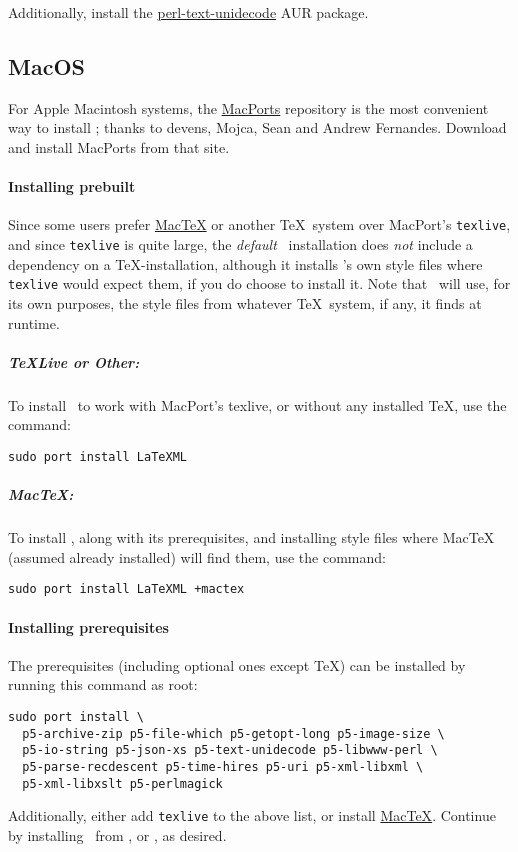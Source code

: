 \documentclass{article}
\begin{document}
Additionally, install the \href{https://aur.archlinux.org/packages/perl-text-unidecode/}{perl-text-unidecode}
AUR package. 



\subsection{MacOS}\label{install.mac}
For Apple Macintosh systems, the  \href{http://www.macports.org}{MacPorts}
repository is the most convenient way to install \LaTeXML;
thanks to devens, Mojca, Sean and Andrew Fernandes.
Download and install MacPorts from that site.

\paragraph{Installing prebuilt}
Since some users prefer \href{http://tug.org/mactex/}{MacTeX} or another
\TeX\ system over MacPort's \texttt{texlive}, and since \texttt{texlive} is quite large,
the \emph{default} \LaTeXML\ installation does \emph{not} include a dependency
on a \TeX-installation, although it installs \LaTeXML's own style files where \texttt{texlive}
would expect them, if you do choose to install it.
Note that \LaTeXML\ will use, for its own purposes, the style files from whatever
\TeX\ system, if any, it finds at runtime.

\subparagraph{TeXLive or Other:} To install \LaTeXML\ to work with MacPort's texlive,
or without any installed \TeX, use the command:
\begin{lstlisting}[style=shell]
sudo port install LaTeXML
\end{lstlisting}

\subparagraph{MacTeX:}  To install \LaTeXML, along with its prerequisites,
and installing style files where MacTeX (assumed already installed) will find them,
use the command:
\begin{lstlisting}[style=shell]
sudo port install LaTeXML +mactex
\end{lstlisting}

\paragraph{Installing prerequisites}\label{install.mac.prereq}
The prerequisites (including optional ones except \TeX) can be installed by running
this command as root: 
\begin{lstlisting}[style=shell]
sudo port install \
  p5-archive-zip p5-file-which p5-getopt-long p5-image-size \
  p5-io-string p5-json-xs p5-text-unidecode p5-libwww-perl \
  p5-parse-recdescent p5-time-hires p5-uri p5-xml-libxml \
  p5-xml-libxslt p5-perlmagick
\end{lstlisting}
Additionally, either add \texttt{texlive} to the above list,
or install \href{http://tug.org/mactex/}{MacTeX}.
Continue by installing \LaTeXML\ from
, 
or \htmlref{GitHub}{install.github}, as desired.
\end{document}
